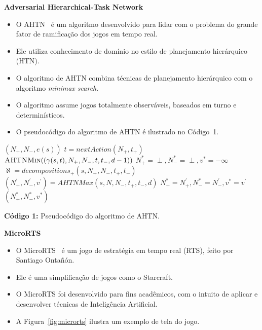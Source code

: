 \documentclass[a0,portrait]{a0poster}
\newcommand\itemadjust{\itemsep.5em \parskip0pt \parsep0pt}
\begin{document}
\begin{multicols}{2}
	\vspace{10mm}
	
	\textbf{Adversarial Hierarchical-Task Network}
	\begin{itemize}
		\item O AHTN~\cite{ontanon2015adversarial} é um algoritmo desenvolvido para lidar com o problema do grande fator de ramificação dos jogos em tempo real. 
		\item Ele utiliza conhecimento de domínio no estilo de planejamento hierárquico (HTN).
		\item O algoritmo de AHTN combina técnicas de planejamento hierárquico com o algoritmo \textit{minimax search}.
		\item O algoritmo assume jogos totalmente observáveis, baseados em turno e determinísticos. 
		\item O pseudocódigo do algoritmo de AHTN é ilustrado no Código~1.
	\end{itemize}
	
	\vspace{8mm}
	{\large	
	\begin{flushleft}

		\begin{algorithmic}[1]
			\label{alg:lin:firstLine}
			\State	\Return $(N_{+}, N_{-}, e(s))$
			\EndIf
			 \label{alg:ahtn:nexaction}
			\State $t = nextAction(N_{+}, t_{+})$ 
			\State \Return $\Call{AHTNMin}{(\gamma(s,t), N_{+}, N_{-}, t, t_{-}, d-1)}$ \label{alg:ahtn:troca}
			\EndIf
			\State $N_{+}^{*} = \perp, N_{-}^{*} = \perp, v^{*} = -\infty$
			\State $\aleph = decompositions_{+}(s, N_{+}, N_{-}, t_{+}, t_{-})$ \label{alg:decompositions}
			 \label{alg:ahtn:for}
			\State $(N^{'}_{+}, N^{'}_{-}, v^{'}) = AHTNMax(s, N, N_{-}, t_{+}, t_{-}, d)$
			\State $N_{+}^{*} = N^{'}_{+}, N_{-}^{*} = N^{'}_{-}, v^{*} = v^{'} $
			\EndIf
			\EndFor		
			\State \Return $(N_{+}^{*}, N_{-}^{*}, v^{*} )$
			\EndFunction
		\end{algorithmic}
	
	\begin{center}
		{\small
		\textbf{Código 1:} Pseudocódigo do algoritmo de AHTN.
		}
	\end{center}
	\end{flushleft}
}
	\vspace{10mm}
	\textbf{MicroRTS}
	\begin{itemize}
		\item O MicroRTS~\cite{ontanon2013combinatorial} é um jogo de estratégia em tempo real (RTS), feito por Santiago Ontañón.
		\item Ele é uma simplificação de jogos como o Starcraft. 
		\item O MicroRTS foi desenvolvido para fins acadêmicos, com o intuito de aplicar e desenvolver técnicas de Inteligência Artificial.
		\item A Figura~\ref{fig:microrts} ilustra um exemplo de tela do jogo.
	\end{itemize}
	

\end{multicols}
\end{document}
